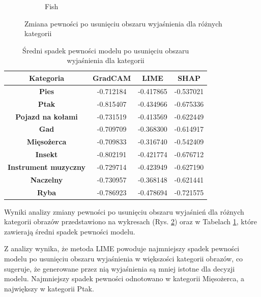 \begin{figure}[h]
\begin{subfigure}[b]{0.3\textwidth}
		\caption{Fish}  \label{rys:base_confidence_no_exp_fish}
	\end{subfigure}
	\caption{Zmiana pewności po usunięciu obszaru wyjaśnienia dla różnych kategorii}
	\label{rys:category_confidence_no_exp}
\end{figure}

\begin{table}[h]
	\centering
	\begin{tabular}{|c|c|c|c|}
		\hline
		\textbf{Kategoria}           & \textbf{GradCAM} & \textbf{LIME} & \textbf{SHAP} \\
		\hline
		\textbf{Pies}                & -0.712184        & -0.417865     & -0.537021     \\
		\hline
		\textbf{Ptak}                & -0.815407        & -0.434966     & -0.675336     \\
		\hline
		\textbf{Pojazd na kołami}    & -0.731519        & -0.413569     & -0.622449     \\
		\hline
		\textbf{Gad}                 & -0.709709        & -0.368300     & -0.614917     \\
		\hline
		\textbf{Mięsożerca}          & -0.709833        & -0.316740     & -0.542409     \\
		\hline
		\textbf{Insekt}              & -0.802191        & -0.421774     & -0.676712     \\
		\hline
		\textbf{Instrument muzyczny} & -0.729714        & -0.423949     & -0.627190     \\
		\hline
		\textbf{Naczelny}            & -0.730957        & -0.368148     & -0.621441     \\
		\hline
		\textbf{Ryba}                & -0.786923        & -0.478694     & -0.721575     \\
		\hline
	\end{tabular}
	\caption{Średni spadek pewności modelu po usunięciu obszaru wyjaśnienia dla kategorii}
	\label{tab:category_confidence_no_exp}
\end{table}

Wyniki analizy zmiany pewności po usunięciu obszaru wyjaśnień dla różnych kategorii obrazów przedstawiono na wykresach (Rys. \ref{rys:category_confidence_no_exp}) oraz w Tabelach \ref{tab:category_confidence_no_exp}, które zawierają średni spadek pewności modelu.

Z analizy wynika, że metoda LIME powoduje najmniejszy spadek pewności modelu po usunięciu obszaru wyjaśnienia w większości kategorii obrazów, co sugeruje, że generowane przez nią wyjaśnienia są mniej istotne dla decyzji modelu.
Najmniejszy spadek pewności odnotowano w kategorii Mięsożerca, a największy w kategorii Ptak.

